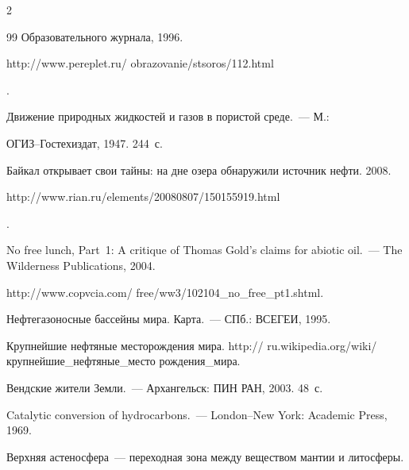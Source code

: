\begin{multicols}{2}
{{\begin{thebibliography}{99}
Образовательного журнала, 1996. {\sf  

http://www.pereplet.ru/ obrazovanie/stsoros/112.html}.





Движение природных жидкостей и газов в пористой среде.~--- М.: 

ОГИЗ--Гостехиздат, 1947.  244~с.




Байкал открывает свои тайны: на дне озера обнару\-жили источник нефти. 2008. {\sf  

http://www.rian.ru/\linebreak elements/20080807/150155919.html}.





No free lunch, Part~1: A critique of Thomas Gold's claims for abiotic oil.~--- The Wilderness Publications, 2004.

 {\sf   http://www.copvcia.com/ free/ww3/102104\_no\_free\_pt1.shtml}.




Нефтегазоносные бассейны мира. Карта.~--- СПб.: ВСЕГЕИ, 1995. 




Крупнейшие нефтяные месторождения мира. {\sf  http:// ru.wikipedia.org/wiki/крупнейшие\_нефтяные\_место рождения\_мира}.





Вендские жители Земли.~--- Архангельск: ПИН РАН, 2003.  48~с.





Catalytic conversion of hydrocarbons.~--- London--New York: Academic Press, 1969.





Верхняя астеносфера~--- переходная зона между веществом мантии и литосферы. {\sf 

}
\end{thebibliography}}}
\end{multicols}
